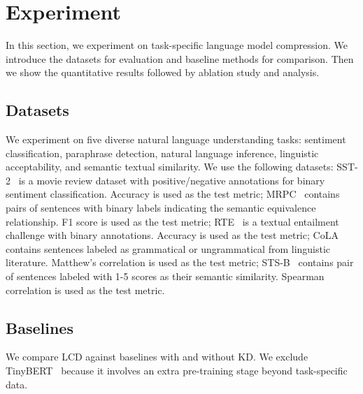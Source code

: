 \section{Experiment}
In this section, we experiment on task-specific language model compression. We introduce the datasets for evaluation and baseline methods for comparison. Then we show the 
quantitative results followed by ablation study and analysis.
\subsection{Datasets}
We experiment on five diverse natural language understanding tasks: sentiment classification, paraphrase detection, natural language inference, 
linguistic acceptability, and semantic textual similarity.
We use the following datasets:
SST-2~\cite{sst2} is a movie review dataset with positive/negative annotations for binary sentiment classification. Accuracy is used as the test metric; MRPC~\cite{mrpc} contains pairs of sentences with binary labels indicating the semantic equivalence relationship. F1 score is used as the test metric;
 RTE~\cite{rte} is a textual entailment challenge with binary annotations. Accuracy is used as the test metric;
 CoLA~\cite{cola} contains sentences labeled as grammatical or ungrammatical from linguistic literature. Matthew's correlation is used as the test metric;
 STS-B~\cite{stsb} contains pair of sentences labeled with 1-5 scores as their semantic similarity. Spearman correlation is used as the test metric.
\subsection{Baselines}
We compare LCD against baselines with and without KD. We exclude TinyBERT~\cite{tinybert} because it involves an extra pre-training stage beyond task-specific data.

